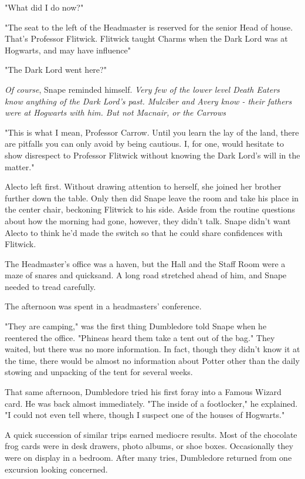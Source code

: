 "What did I do now?"

"The seat to the left of the Headmaster is reserved for the senior Head of house. That's Professor Flitwick. Flitwick taught Charms when the Dark Lord was at Hogwarts, and may have influence{\el}"

"The Dark Lord went here?"

\emph{Of course}, Snape reminded himself. \emph{Very few of the lower level Death Eaters know anything of the Dark Lord's past. Mulciber and Avery know - their fathers were at Hogwarts with him. But not Macnair, or the Carrows{\el}}

"This is what I mean, Professor Carrow. Until you learn the lay of the land, there are pitfalls you can only avoid by being cautious. I, for one, would hesitate to show disrespect to Professor Flitwick without knowing the Dark Lord's will in the matter."

Alecto left first. Without drawing attention to herself, she joined her brother further down the table. Only then did Snape leave the room and take his place in the center chair, beckoning Flitwick to his side. Aside from the routine questions about how the morning had gone, however, they didn't talk. Snape didn't want Alecto to think he'd made the switch so that he could share confidences with Flitwick.

The Headmaster's office was a haven, but the Hall and the Staff Room were a maze of snares and quicksand. A long road stretched ahead of him, and Snape needed to tread carefully.

The afternoon was spent in a headmasters' conference.

"They are camping," was the first thing Dumbledore told Snape when he reentered the office. "Phineas heard them take a tent out of the bag." They waited, but there was no more information. In fact, though they didn't know it at the time, there would be almost no information about Potter other than the daily stowing and unpacking of the tent for several weeks.

That same afternoon, Dumbledore tried his first foray into a Famous Wizard card. He was back almost immediately. "The inside of a footlocker," he explained. "I could not even tell where, though I suspect one of the houses of Hogwarts."

A quick succession of similar trips earned mediocre results. Most of the chocolate frog cards were in desk drawers, photo albums, or shoe boxes. Occasionally they were on display in a bedroom. After many tries, Dumbledore returned from one excursion looking concerned.

